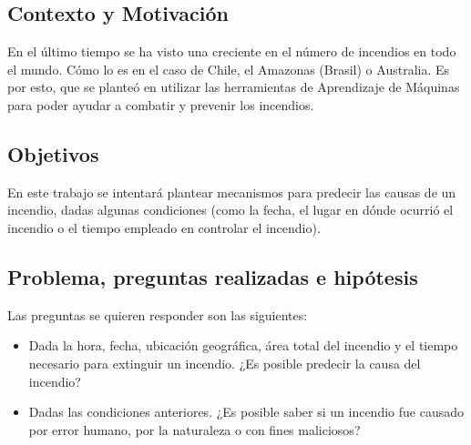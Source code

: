 




\subsection{Contexto y Motivación}
En el último tiempo se ha visto una creciente en el número de incendios en todo el mundo. Cómo lo es en el caso de Chile, el Amazonas (Brasil) o Australia. Es por esto, que se planteó en utilizar las herramientas de Aprendizaje de Máquinas para poder ayudar a combatir y prevenir los incendios.

\subsection{Objetivos}
En este trabajo se intentará plantear mecanismos para predecir las causas de un incendio, dadas algunas condiciones (como la fecha, el lugar en dónde ocurrió el incendio o el tiempo empleado en controlar el incendio).

\subsection{Problema, preguntas realizadas e hipótesis}
Las preguntas se quieren responder son las siguientes:
\begin{itemize}
    \item Dada la hora, fecha, ubicación geográfica, área total del incendio y el tiempo necesario para extinguir un incendio. ¿Es posible predecir la causa del incendio?
    \item Dadas las condiciones anteriores. ¿Es posible saber si un incendio fue causado por error humano, por la naturaleza o con fines maliciosos?
\end{itemize}
